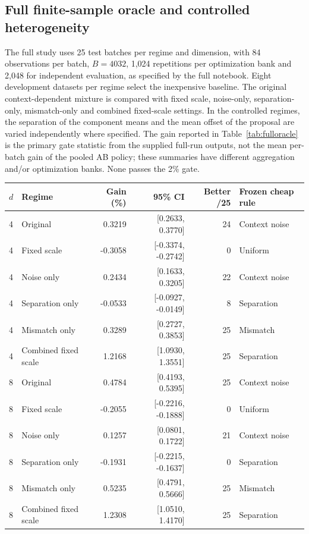 \documentclass[10pt,letterpaper]{article}
\begin{document}
\subsection{Full finite-sample oracle and controlled heterogeneity}
The full study uses 25 test batches per regime and dimension, with 84 observations per batch, $B=4032$, 1,024 repetitions per optimization bank and 2,048 for independent evaluation, as specified by the full notebook. Eight development datasets per regime select the inexpensive baseline. The original context-dependent mixture is compared with fixed scale, noise-only, separation-only, mismatch-only and combined fixed-scale settings. In the controlled regimes, the separation of the component means and the mean offset of the proposal are varied independently where specified. The gain reported in Table~\ref{tab:fulloracle} is the primary gate statistic from the supplied full-run outputs, not the mean per-batch gain of the pooled AB policy; these summaries have different aggregation and/or optimization banks. None passes the 2\% gate.
\begin{center}\begin{minipage}{\linewidth}\centering\small
\begin{tabular}{@{}llrrrl@{}}\toprule
$d$ & Regime & Gain (\%) & 95\% CI & Better /25 & Frozen cheap rule\\\midrule
4 & Original & 0.3219 & [0.2633, 0.3770] & 24 & Context noise\\
4 & Fixed scale & -0.3058 & [-0.3374, -0.2742] & 0 & Uniform\\
4 & Noise only & 0.2434 & [0.1633, 0.3205] & 22 & Context noise\\
4 & Separation only & -0.0533 & [-0.0927, -0.0149] & 8 & Separation\\
4 & Mismatch only & 0.3289 & [0.2727, 0.3853] & 25 & Mismatch\\
4 & Combined fixed scale & 1.2168 & [1.0930, 1.3551] & 25 & Separation\\\midrule
8 & Original & 0.4784 & [0.4193, 0.5395] & 25 & Context noise\\
8 & Fixed scale & -0.2055 & [-0.2216, -0.1888] & 0 & Uniform\\
8 & Noise only & 0.1257 & [0.0801, 0.1722] & 21 & Context noise\\
8 & Separation only & -0.1931 & [-0.2215, -0.1637] & 0 & Separation\\
8 & Mismatch only & 0.5235 & [0.4791, 0.5666] & 25 & Mismatch\\
8 & Combined fixed scale & 1.2308 & [1.0510, 1.4170] & 25 & Separation\\\bottomrule
\end{tabular}\label{tab:fulloracle}\end{minipage}\end{center}
\end{document}
